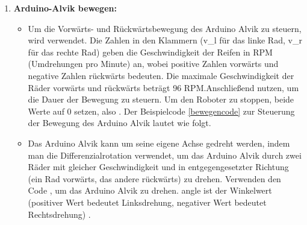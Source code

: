 \begin{enumerate}
	\item \textbf{Arduino-Alvik bewegen:}
	\begin{itemize}
		\item Um die Vorwärts- und Rückwärtsbewegung des Arduino Alvik zu steuern, wird  verwendet. Die Zahlen in den Klammern (v\_l für das linke Rad, v\_r für das rechte Rad) geben die Geschwindigkeit der Reifen in RPM (Umdrehungen pro Minute) an, wobei positive Zahlen vorwärts und negative Zahlen rückwärts bedeuten. Die maximale Geschwindigkeit der Räder vorwärts und rückwärts beträgt 96 RPM.Anschlie\ss end  nutzen, um die Dauer der Bewegung zu steuern. Um den Roboter zu stoppen, beide Werte auf 0 setzen, also . Der Beispielcode \ref{bewegencode} zur Steuerung der Bewegung des Arduino Alvik lautet wie folgt.
		\item Das Arduino Alvik kann um seine eigene Achse gedreht werden, indem man die Differenzialrotation verwendet, um das Arduino Alvik durch zwei Räder mit gleicher Geschwindigkeit und in entgegengesetzter Richtung (ein Rad vorwärts, das andere rückwärts) zu drehen. Verwenden den Code , um das Arduino Alvik zu drehen. angle ist der Winkelwert (positiver Wert bedeutet Linksdrehung, negativer Wert bedeutet Rechtsdrehung) \cite{Paolo:2025}. 
	\end{itemize} 
	{
		\label{bewegencode}	
}
\end{enumerate}
